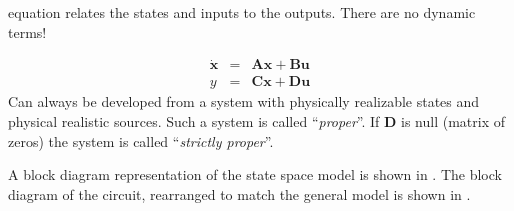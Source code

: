 equation relates the states and inputs to the outputs. There are
no dynamic terms!
\begin{slide}\label{slides:l13s7}
\begin{eqnarray*}
\dot{\mathbf{x}}&=&\mathbf{A}\mathbf{x}+\mathbf{B}\mathbf{u}\\
{y}&=&\mathbf{C}\mathbf{x}+\mathbf{D}\mathbf{u}
\end{eqnarray*}
Can always be developed from a system with physically realizable
states and physical realistic sources. Such a system is called
``\emph{proper}''. If $\mathbf{D}$ is null (matrix of zeros) the
system is called ``\emph{strictly proper}''.
\end{slide}
A block diagram representation of the state space model is shown
in . The block diagram of the circuit, rearranged
to match the general model is shown in .
\begin{slide}\label{slides:l13s8}
\end{slide}
